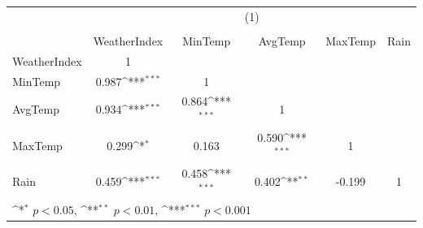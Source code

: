 {
\def\sym#1{\ifmmode^{#1}\else\(^{#1}\)\fi}
\begin{tabular}{l*{5}{c}}
\hline\hline
          &\multicolumn{5}{c}{(1)}                                                                       \\
          &\multicolumn{5}{c}{}                                                                          \\
          &WeatherIndex         &  MinTemp         &  AvgTemp         &  MaxTemp         &     Rain         \\
\hline
WeatherIndex&        1         &                  &                  &                  &                  \\
MinTemp   &    0.987\sym{***}&        1         &                  &                  &                  \\
AvgTemp   &    0.934\sym{***}&    0.864\sym{***}&        1         &                  &                  \\
MaxTemp   &    0.299\sym{*}  &    0.163         &    0.590\sym{***}&        1         &                  \\
Rain      &    0.459\sym{***}&    0.458\sym{***}&    0.402\sym{**} &   -0.199         &        1         \\
\hline\hline
\multicolumn{6}{l}{\footnotesize \sym{*} \(p<0.05\), \sym{**} \(p<0.01\), \sym{***} \(p<0.001\)}\\
\end{tabular}
}
